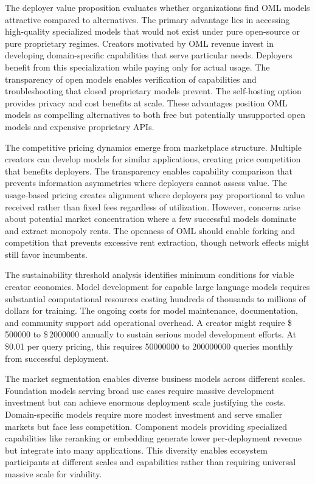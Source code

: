 The deployer value proposition evaluates whether organizations find OML models attractive compared to alternatives. The primary advantage lies in accessing high-quality specialized models that would not exist under pure open-source or pure proprietary regimes. Creators motivated by OML revenue invest in developing domain-specific capabilities that serve particular needs. Deployers benefit from this specialization while paying only for actual usage. The transparency of open models enables verification of capabilities and troubleshooting that closed proprietary models prevent. The self-hosting option provides privacy and cost benefits at scale. These advantages position OML models as compelling alternatives to both free but potentially unsupported open models and expensive proprietary APIs.

The competitive pricing dynamics emerge from marketplace structure. Multiple creators can develop models for similar applications, creating price competition that benefits deployers. The transparency enables capability comparison that prevents information asymmetries where deployers cannot assess value. The usage-based pricing creates alignment where deployers pay proportional to value received rather than fixed fees regardless of utilization. However, concerns arise about potential market concentration where a few successful models dominate and extract monopoly rents. The openness of OML should enable forking and competition that prevents excessive rent extraction, though network effects might still favor incumbents.

The sustainability threshold analysis identifies minimum conditions for viable creator economics. Model development for capable large language models requires substantial computational resources costing hundreds of thousands to millions of dollars for training. The ongoing costs for model maintenance, documentation, and community support add operational overhead. A creator might require \$\,\num{500000} to \$\,\num{2000000} annually to sustain serious model development efforts. At \$0.01 per query pricing, this requires \num{50000000} to \num{200000000} queries monthly from successful deployment.


The market segmentation enables diverse business models across different scales. Foundation models serving broad use cases require massive development investment but can achieve enormous deployment scale justifying the costs. Domain-specific models require more modest investment and serve smaller markets but face less competition. Component models providing specialized capabilities like reranking or embedding generate lower per-deployment revenue but integrate into many applications. This diversity enables ecosystem participants at different scales and capabilities rather than requiring universal massive scale for viability.

